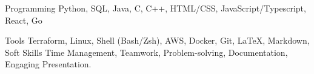 

\begin{cvskills}

  \cvskill
    {Programming} %
    {
      Python, 
      SQL,
      Java,
      C,
      C++, 
      HTML/CSS, 
      JavaScript/Typescript,
      React,
      Go
    } %

  \cvskill
    {Tools} %
    {
      Terraform,
      Linux, 
      Shell (Bash/Zsh), 
      AWS,
      Docker,
      Git,
      \LaTeX,
      Markdown, 
    } %
  \cvskill
    {Soft Skills} %
    {
      Time Management, 
      Teamwork, 
      Problem-solving, 
      Documentation, 
      Engaging Presentation.
    } %

\end{cvskills}
